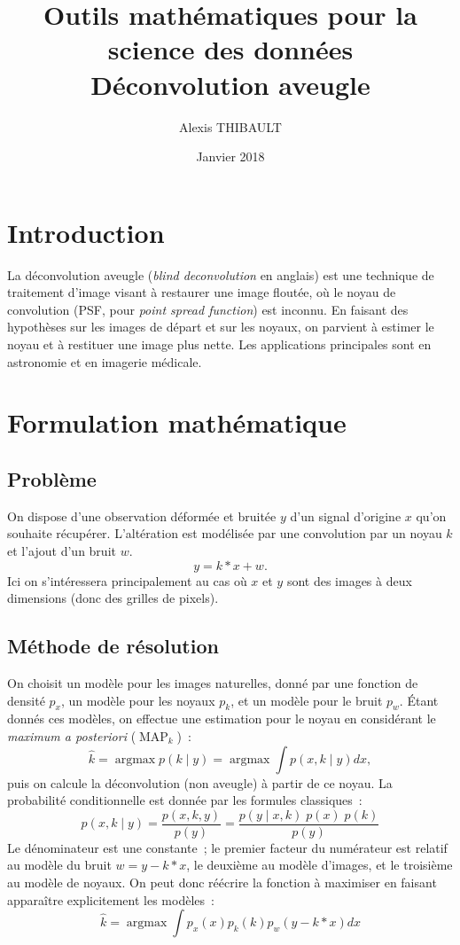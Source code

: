 \documentclass[french,a4paper]{article}
\title{Outils mathématiques pour la science des données\\
Déconvolution aveugle}
\date{Janvier 2018}
\author{Alexis THIBAULT}
\theoremstyle{plain}
\theoremstyle{definition}
\theoremstyle{remark}
\DeclareMathOperator*{\argmax}{argmax}
\DeclareMathOperator{\MAP}{MAP}
\begin{document}
\maketitle


\section{Introduction}
La déconvolution aveugle (\textit{blind deconvolution} en anglais) est une technique de traitement d'image visant à restaurer une image floutée, où le noyau de convolution (PSF, pour \textit{point spread function}) est inconnu. En faisant des hypothèses sur les images de départ et sur les noyaux, on parvient à estimer le noyau et à restituer une image plus nette. Les applications principales sont en astronomie et en imagerie médicale.

\section{Formulation mathématique}
\subsection{Problème}
On dispose d'une observation déformée et bruitée $y$ d'un signal d'origine $x$ qu'on souhaite récupérer. L'altération est modélisée par une convolution par un noyau $k$ et l'ajout d'un bruit $w$.
\[
y = k * x + w.
\]
Ici on s'intéressera principalement au cas où $x$ et $y$ sont des images à deux dimensions (donc des grilles de pixels).
\subsection{Méthode de résolution}
On choisit un modèle pour les images naturelles, donné par une fonction de densité $p_x$, un modèle pour les noyaux $p_k$, et un modèle pour le bruit $p_w$.
Étant donnés ces modèles, on effectue une estimation pour le noyau en considérant le \emph{maximum a posteriori} ($\MAP_k$)~:
\[
\hat{k} = \argmax p\left( k \mid y \right) = \argmax \int p\left( x,k \mid y \right) dx,
\]
puis on calcule la déconvolution (non aveugle) à partir de ce noyau. La probabilité conditionnelle est donnée par les formules classiques~:
\[
p\left(x,k \mid y \right) = \frac{p(x,k,y)}{p(y)} = \frac{p(y \mid x,k) \; p(x) \; p(k)}{p(y)}
\]
Le dénominateur est une constante~; le premier facteur du numérateur est relatif au modèle du bruit $w = y - k*x$, le deuxième au modèle d'images, et le troisième au modèle de noyaux. On peut donc réécrire la fonction à maximiser en faisant apparaître explicitement les modèles~:
\[
\hat{k} = \argmax \int p_x(x) p_k(k) p_w(y - k*x) dx
\]
\end{document}
